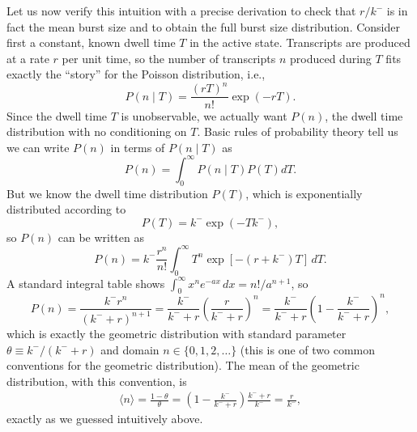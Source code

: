 \documentclass[12pt]{article}%
\begin{document}
Let us now verify this intuition with a precise derivation
to check that $r/k^-$ is in fact the mean burst size
and to obtain the full burst size distribution.
Consider first a constant, known dwell time $T$ in the active state.
Transcripts are produced at a rate $r$ per unit time, so the
number of transcripts $n$ produced during $T$ fits exactly
the ``story'' for the Poisson distribution, i.e.,
\begin{equation}
    P(n\mid T) = \frac{(rT)^n}{n!} \exp(-rT).
\end{equation}
Since the dwell time $T$ is unobservable, we actually want $P(n)$,
the dwell time distribution with no conditioning on $T$.
Basic rules of probability theory tell us we can write $P(n)$
in terms of $P(n\mid T)$ as
\begin{equation}
    P(n) =\int_0^\infty P(n\mid T) P(T) dT.
\end{equation}
But we know the dwell time distribution $P(T)$,
which is exponentially distributed according to
\begin{equation}
    P(T) = k^- \exp(-T k^-),
\end{equation}
so $P(n)$ can be written as
\begin{equation}
    P(n) = k^- \frac{r^n}{n!}
            \int_0^\infty T^n\exp[-(r + k^-)T]\,dT.
\end{equation}
A standard integral table shows
$\int_0^\infty x^n e^{-ax}\,dx = n!/a^{n+1}$, so
\begin{equation}
    P(n) = \frac{k^- r^n}{(k^- + r)^{n+1}}
        = \frac{k^-}{k^- + r}
            \left(\frac{r}{k^- + r}\right)^n
        = \frac{k^-}{k^- + r}
            \left(1 - \frac{k^-}{k^- + r}\right)^n,
\end{equation}
which is exactly the geometric distribution with standard parameter
$\theta\equiv k^-/(k^- + r)$ and domain
$n \in \{0, 1, 2, \dots\}$
(this is one of two common conventions for the geometric distribution).
The mean of the geometric distribution, with this convention, is
\begin{align}
\langle n\rangle = \frac{1 - \theta}{\theta}
        = \left(1 - \frac{k^-}{k^- + r}\right)
                    \frac{k^- + r}{k^-}
        = \frac{r}{k^-},
\end{align}
exactly as we guessed intuitively above.
\end{document}
